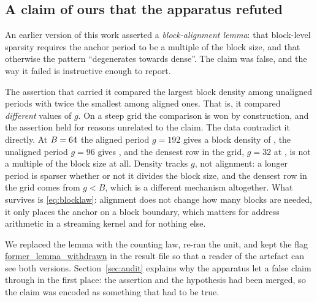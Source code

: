 \subsection{A claim of ours that the apparatus refuted}\label{sec:attn_withdraw}

An earlier version of this work asserted a \emph{block-alignment lemma}: that
block-level sparsity requires the anchor period to be a multiple of the block
size, and that otherwise the pattern ``degenerates towards dense''. The claim was
false, and the way it failed is instructive enough to report.

The assertion that carried it compared the largest block density among unaligned
periods with twice the smallest among aligned ones. That is, it compared
\emph{different} values of $g$. On a steep grid the comparison is won by
construction, and the assertion held for reasons unrelated to the claim. The data
contradict it directly. At $B=64$ the aligned period $g=192$ gives a
block density of \WithdrawDensAligned{}, the unaligned period $g=96$ gives
\WithdrawDensUnaligned{}, and the densest row in the grid, $g=32$ at
\WithdrawDensDensest{}, is not a multiple of the block size at all. Density
tracks $g$, not alignment: a longer period is sparser whether or not it divides
the block size, and the densest row in the grid comes from $g<B$, which is a
different mechanism altogether. What survives is
\eqref{eq:blocklaw}: alignment does not change how many blocks are needed, it only
places the anchor on a block boundary, which matters for address arithmetic in a
streaming kernel and for nothing else.

We replaced the lemma with the counting law, re-ran the unit, and kept the flag
\url{former_lemma_withdrawn} in the result file so that a reader of the
artefact can see both versions. Section~\ref{sec:audit} explains why the apparatus
let a false claim through in the first place: the assertion and the hypothesis had
been merged, so the claim was encoded as something that had to be true.
